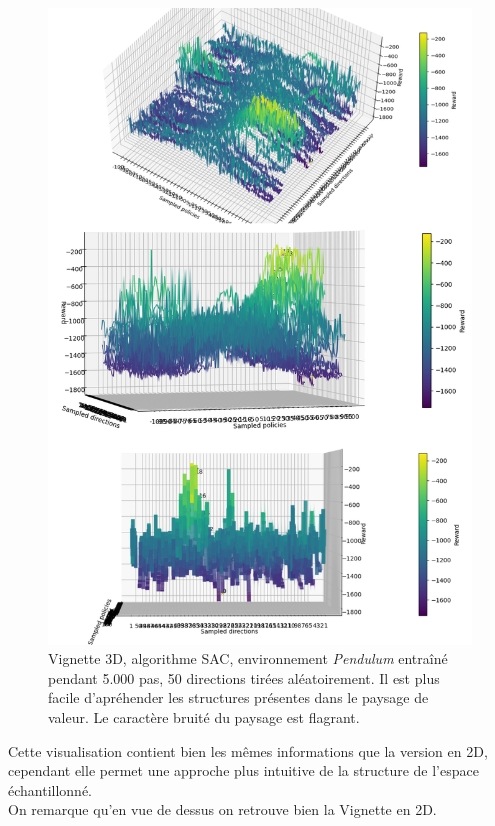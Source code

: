 \documentclass[12pt]{article}
\begin{document}
\begin{figure}[htp]
    \centering
    \includegraphics[width=18cm]{Images/vignette_3D}
    \caption{Vignette 3D, algorithme SAC, environnement \emph{Pendulum} entraîné pendant 5.000 pas, 50 directions tirées aléatoirement. Il est plus facile d'apréhender les structures présentes dans le paysage de valeur. Le caractère bruité du paysage est flagrant.}
    \label{fig:vignette3D}
\end{figure}

Cette visualisation contient bien les mêmes informations que la version en 2D, cependant elle permet une approche plus intuitive de la structure de l'espace échantillonné. \\

On remarque qu'en vue de dessus on retrouve bien la Vignette en 2D. \\
\end{document}
